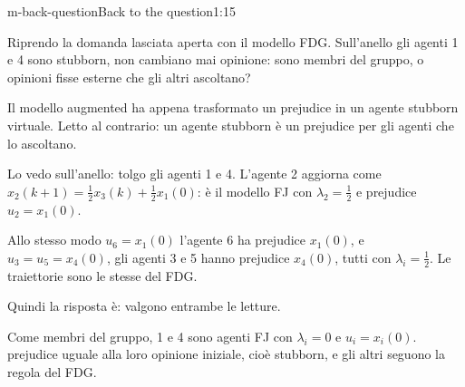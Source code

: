 \begin{slidedue}{m-back-question}{Back to the question\spostata}{1:15 {\color{red}}}
  \begin{discorso}
    \item {\color{red}        }
    \item {\color{red}         } {\color{blue}Riprendo la domanda lasciata aperta} con il {\color{red}    } {\color{blue}modello FDG. Sull'anello} gli agenti {\color{blue}1 e 4 sono} stubborn, {\color{red}  } {\color{blue}non cambiano mai opinione: sono membri del gruppo, o} opinioni {\color{red}    } {\color{blue}fisse esterne} che {\color{red} } {\color{blue}gli altri ascoltano?}
    \item {\color{blue}Il modello augmented ha appena trasformato un prejudice in un agente stubborn virtuale. Letto al contrario: un agente stubborn è un prejudice per gli agenti che lo ascoltano.}
    \item {\color{red}  } {\color{blue}Lo vedo sull'anello: tolgo gli agenti 1 e 4. L'agente} 2 aggiorna come $x_2(k+1)=\tfrac12x_3(k)+\tfrac12x_1(0)$: è il modello FJ con $\lambda_2=\tfrac12$ e {\color{blue}prejudice} $u_2=x_1(0)$.
    \item Allo stesso modo {\color{red}$u_6=x_1(0)$} {\color{blue}l'agente 6 ha prejudice $x_1(0)$,} e {\color{red}$u_3=u_5=x_4(0)$,} {\color{blue}gli agenti 3 e 5 hanno prejudice $x_4(0)$,} tutti con $\lambda_i=\tfrac12$. Le traiettorie sono le {\color{red}} {\color{blue}stesse del FDG.}
    \item {\color{blue}\clic} Quindi la risposta è: valgono entrambe le letture.
    \item Come {\color{red}} {\color{blue}membri} del gruppo, {\color{red}       } {\color{blue}1 e 4 sono agenti FJ con} $\lambda_i=0$ e {\color{red}$u_i=x_i(0)$.} {\color{red}} {\color{blue}prejudice uguale alla loro} opinione {\color{red}       } {\color{blue}iniziale, cioè stubborn, e gli altri seguono} la {\color{red}  } {\color{blue}regola del FDG.}

\end{discorso}
\end{slidedue}
